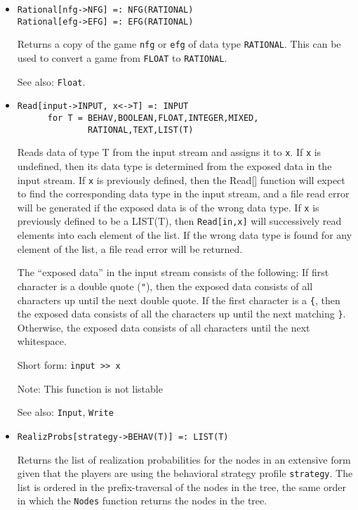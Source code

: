 \begin{itemize}
\item
\protect \large \begin{verbatim}
Rational[nfg->NFG] =: NFG(RATIONAL)
Rational[efg->EFG] =: EFG(RATIONAL)
\end{verbatim} \normalsize

\bd
Returns a copy of the game \verb+nfg+ or \verb+efg+ of data type 
{\tt RATIONAL}.  This can be used to convert a game from {\tt FLOAT}
to {\tt RATIONAL}.  
\item
[See also:] {\tt Float}.
\ed

\item
\protect \large \begin{verbatim}
Read[input->INPUT, x<->T] =: INPUT  
      for T = BEHAV,BOOLEAN,FLOAT,INTEGER,MIXED,
              RATIONAL,TEXT,LIST(T)
\end{verbatim}\normalsize

\bd Reads data of type T from the input stream and assigns it to
\verb+x+.  If \verb+x+ is undefined, then its data type is determined
from the exposed data in the input stream.  If \verb+x+ is previously
defined, then the Read[] function will expect to find the
corresponding data type in the input stream, and a file read error
will be generated if the exposed data is of the wrong data type.  If
\verb+x+ is previously defined to be a LIST(T), then \verb+Read[in,x]+
will successively read elements into each element of the list.  If the
wrong data type is found for any element of the list, a file read
error will be returned.

The ``exposed data'' in the input stream consists of the following: If
first character is a double quote (\verb+"+), then the exposed data
consists of all characters up until the next double quote.  If the
first character is a \verb+{+, then the exposed data consists of all
the characters up until the next matching \verb+}+.  Otherwise, the
exposed data consists of all characters until the next whitespace.
\item
[Short form:] \verb+input >> x+
\item
[Note:] This function is not listable
\item
[See also:] {\tt Input},  {\tt Write}
\ed

\item
\protect \large \begin{verbatim}
RealizProbs[strategy->BEHAV(T)] =: LIST(T)
\end{verbatim}\normalsize

\bd
Returns the list of realization probabilities for the
nodes in an extensive form given that the players are using the behavioral
strategy profile \verb+strategy+.  The list is ordered in the prefix-traversal
of the nodes in the tree, the same order in which the {\tt Nodes} function
returns the nodes in the tree.
\ed


\end{itemize}

